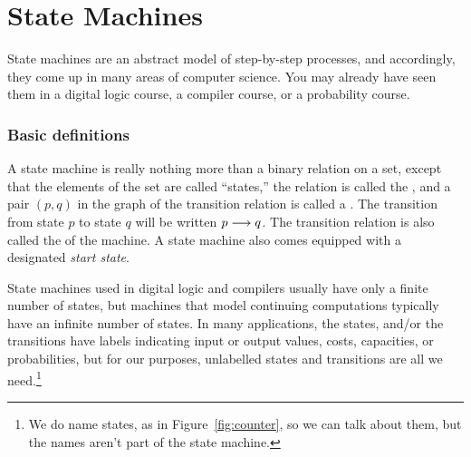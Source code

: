 \chapter{State Machines}\label{state_machine_chap}

\providecommand{\boys}{\text{the-Boys}}
\providecommand{\girls}{\text{the-Girls}}
\providecommand{\qst}{\text{$q_0$}}
\providecommand{\none}{\texttt{none}}
\providecommand{\girln}{\text{$\girls \union \set{\none}$}}
\providecommand{\boyn}{\text{$\boys \union \set{\none}$}}
\providecommand{\sere}{\text{\emph{serenading}}}
\providecommand{\suit}{\text{\emph{suitors}}}
\providecommand{\fav}{\text{\emph{favorite}}}
\providecommand{\nex}{\text{\emph{next}}}
\providecommand{\tgn}{\text{\emph{total-girls-names}}}


\label{state_machine_sec}

State machines are an abstract model of step-by-step processes, and
accordingly, they come up in many areas of computer science.  You may
already have seen them in a digital logic course, a compiler course, or a
probability course.

\subsection{Basic definitions}

A state machine is really nothing more than a binary relation on a
set, except that the elements of the set are called ``states,'' the
relation is called the , and a pair $(p,q)$
in the graph of the transition relation is called a .
The transition from state $p$ to state $q$ will be written $p \mathrel{\longrightarrow}
q$.  The transition relation is also called the  of
the machine.  A state machine also comes equipped with a designated
\emph{start state}.

State machines used in digital logic and compilers usually have only a
finite number of states, but machines that model continuing computations
typically have an infinite number of states.  In many applications, the
states, and/or the transitions have labels indicating input or output
values, costs, capacities, or probabilities, but for our purposes,
unlabelled states and transitions are all we need.\footnote{We do name
states, as in Figure~\ref{fig:counter}, so we can talk about them, but the
names aren't part of the state machine.}

